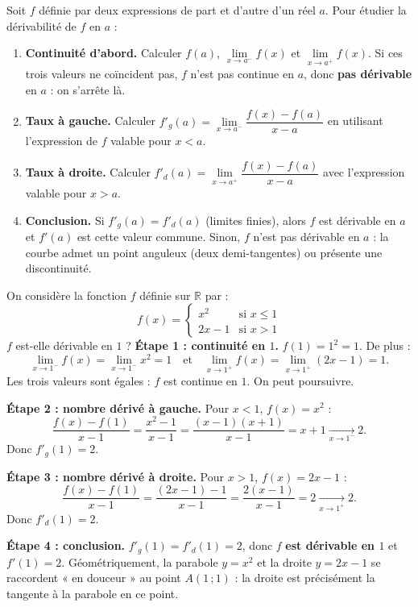 \documentclass[11pt]{article}
\begin{document}
\begin{methode}
Soit $f$ définie par deux expressions de part et d'autre d'un réel $a$. Pour étudier la dérivabilité de $f$ en $a$ :
\begin{enumerate}
\item \textbf{Continuité d'abord.} Calculer $f(a)$, $\lim\limits_{x \to a^{-}} f(x)$ et $\lim\limits_{x \to a^{+}} f(x)$. Si ces trois valeurs ne coïncident pas, $f$ n'est pas continue en $a$, donc \textbf{pas dérivable} en $a$ : on s'arrête là.
\item \textbf{Taux à gauche.} Calculer $f'_{g}(a) = \lim\limits_{x \to a^{-}} \dfrac{f(x)-f(a)}{x-a}$ en utilisant l'expression de $f$ valable pour $x < a$.
\item \textbf{Taux à droite.} Calculer $f'_{d}(a) = \lim\limits_{x \to a^{+}} \dfrac{f(x)-f(a)}{x-a}$ avec l'expression valable pour $x > a$.
\item \textbf{Conclusion.} Si $f'_{g}(a) = f'_{d}(a)$ (limites finies), alors $f$ est dérivable en $a$ et $f'(a)$ est cette valeur commune. Sinon, $f$ n'est pas dérivable en $a$ : la courbe admet un point anguleux (deux demi-tangentes) ou présente une discontinuité.
\end{enumerate}
\end{methode}

\begin{exoresolu}
On considère la fonction $f$ définie sur $\mathbb{R}$ par :
\[ f(x) = \begin{cases} x^{2} & \text{si } x \leq 1 \\ 2x - 1 & \text{si } x > 1 \end{cases} \]
$f$ est-elle dérivable en $1$ ?
\tcblower
\textbf{Étape 1 : continuité en $1$.}
$f(1) = 1^{2} = 1$. De plus :
\[ \lim_{x \to 1^{-}} f(x) = \lim_{x \to 1^{-}} x^{2} = 1 \quad \text{et} \quad \lim_{x \to 1^{+}} f(x) = \lim_{x \to 1^{+}} (2x-1) = 1. \]
Les trois valeurs sont égales : $f$ est continue en $1$. On peut poursuivre.

\textbf{Étape 2 : nombre dérivé à gauche.} Pour $x < 1$, $f(x) = x^{2}$ :
\[ \frac{f(x)-f(1)}{x-1} = \frac{x^{2}-1}{x-1} = \frac{(x-1)(x+1)}{x-1} = x+1 \xrightarrow[x \to 1^{-}]{} 2. \]
Donc $f'_{g}(1) = 2$.

\textbf{Étape 3 : nombre dérivé à droite.} Pour $x > 1$, $f(x) = 2x-1$ :
\[ \frac{f(x)-f(1)}{x-1} = \frac{(2x-1)-1}{x-1} = \frac{2(x-1)}{x-1} = 2 \xrightarrow[x \to 1^{+}]{} 2. \]
Donc $f'_{d}(1) = 2$.

\textbf{Étape 4 : conclusion.} $f'_{g}(1) = f'_{d}(1) = 2$, donc $f$ \textbf{est dérivable en $1$} et $f'(1) = 2$. Géométriquement, la parabole $y = x^{2}$ et la droite $y = 2x-1$ se raccordent « en douceur » au point $A(1\,;1)$ : la droite est précisément la tangente à la parabole en ce point.
\end{exoresolu}
\end{document}
